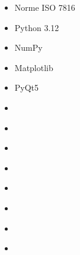 \documentclass{article}
\begin{document}
\begin{tabular}
\begin{itemize}[label={}, topsep=8pt, partopsep=0pt, itemsep=0.5pt, parsep=2pt,after=\vspace*{-\baselineskip}]
        \begin{itemize}
        [label={\textcolor{gray!80}{\checkmark}}, topsep=8pt, partopsep=0pt, itemsep=0.5pt, parsep=2pt] 
            \item \textcolor{gray!80}{Norme ISO 7816}
            \item \textcolor{gray!80}{Python 3.12}
            \item \textcolor{gray!80}{NumPy}
            \item \textcolor{gray!80}{Matplotlib}
            \item \textcolor{gray!80}{PyQt5}
            \item[\textcolor{white}{\checkmark}] \textcolor{gray!80}{} %
            \item[\textcolor{white}{\checkmark}] \textcolor{gray!80}{} %
            \item[\textcolor{white}{\checkmark}] \textcolor{gray!80}{} %
            \item[\textcolor{white}{\checkmark}] \textcolor{gray!80}{} %
            \item[\textcolor{white}{\checkmark}] \textcolor{gray!80}{} %
            \item[\textcolor{white}{\checkmark}] \textcolor{gray!80}{} %
            \item[\textcolor{white}{\checkmark}] \textcolor{gray!80}{} %
            \item[\textcolor{white}{\checkmark}] \textcolor{gray!80}{} %
        \end{itemize}
    \end{itemize}
\end{tabular}

\begin{center}
\end{center}

\end{document}
